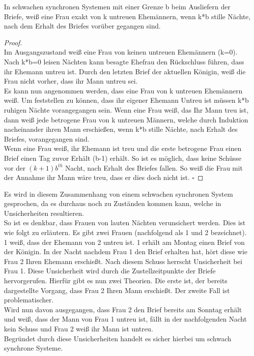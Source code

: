 \begin{satz} 
\label{prop_weak_sync}
In schwachen synchronen Systemen mit einer Grenze b beim Ausliefern der Briefe, weiß eine Frau exakt von k untreuen Ehemännern, wenn k*b stille Nächte, nach dem Erhalt des Briefes vorüber gegangen sind.
\end{satz}
\begin{proof}\hfill\\
Im Ausgangszustand weiß eine Frau von keinen untreuen Ehemännern (k=0). Nach k*b=0 leisen Nächten kann besagte Ehefrau den Rückschluss führen, dass ihr Ehemann untreu ist. Durch den letzten Brief der aktuellen Königin, weiß die Frau nicht vorher, dass ihr Mann untreu sei. \\Es kann nun angenommen werden, dass eine Frau von k untreuen Ehemännern weiß. Um feststellen zu können, dass ihr eigener Ehemann Untreu ist müssen k*b ruhigen Nächte vorangegangen sein. Wenn eine Frau weiß, das Ihr Mann treu ist, dann weiß jede betrogene Frau von k untreuen Männern, welche durch Induktion nacheinander ihren Mann erschießen, wenn k*b stille Nächte, nach Erhalt des Briefes, vorangegangen sind.\\ Wenn eine Frau weiß, ihr Ehemann ist treu und die erste betrogene Frau einen Brief einen Tag zuvor Erhält (b-1) erhält. So ist es möglich, dass keine Schüsse vor der $(k+1)b^{th}$ Nacht, nach Erhalt des Briefes fallen. So weiß die Frau mit der Annahme ihr Mann wäre treu, dass er dies doch nicht ist.
$\square$
\end{proof}
Es wird in diesem Zusammenhang von einem schwachen synchronen System gesprochen, da es durchaus noch zu Zuständen kommen kann, welche in Unsicherheiten resultieren. \\So ist es denkbar, dass Frauen von lauten Nächten verunsichert werden. Dies ist wie folgt zu erläutern. Es gibt zwei Frauen (nachfolgend als 1 und 2 bezeichnet). 1 weiß, dass der Ehemann von 2 untreu ist. 1 erhält am Montag einen Brief von der Königin. In der Nacht nachdem Frau 1 den Brief erhalten hat, hört diese wie Frau 2 Ihren Ehemann erschießt. Nach diesem Schuss herrscht Unsicherheit bei Frau 1. Diese Unsicherheit wird durch die Zustellzeitpunkte der Briefe hervorgerufen. Hierfür gibt es nun zwei Theorien. Die erste ist, der bereits dargestellte Vorgang, dass Frau 2 Ihren Mann erschießt. Der zweite Fall ist problematischer.\\ Wird nun davon ausgegangen, dass Frau 2 den Brief bereits am Sonntag erhält und weiß, dass der Mann von Frau 1 untreu ist, fällt in der nachfolgenden Nacht kein Schuss und Frau 2 weiß ihr Mann ist untreu. \\
Begründet durch diese Unsicherheiten handelt es sicher hierbei um schwach synchrone Systeme. 

